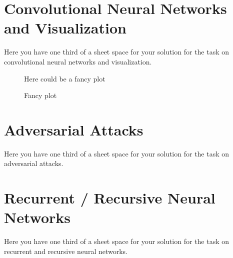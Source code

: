 \documentclass[a4paper,11pt]{article}
\author{Team Member 1, Team Member 2, Team Member 3}
\begin{document}
\section{Convolutional Neural Networks and Visualization}

Here you have one third of a sheet space for your solution for
the task on convolutional neural networks and visualization.

\begin{wrapfigure}{r}{0.3\textwidth}
\begin{center}
Here could be a fancy plot
\end{center}
\caption{Fancy plot}
\end{wrapfigure}

\section{Adversarial Attacks}

Here you have one third of a sheet space for your solution for
the task on adversarial attacks.

\section{Recurrent / Recursive Neural Networks}

Here you have one third of a sheet space for your solution for
the task on recurrent and recursive neural networks.
\end{document}
